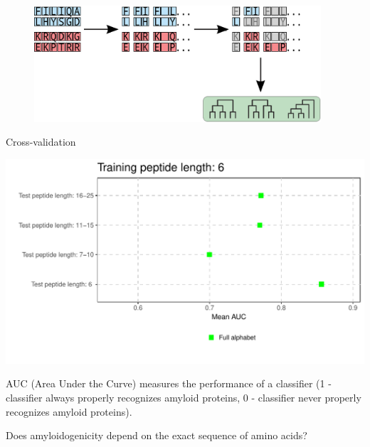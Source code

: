 \documentclass{beamer}\usepackage[]{graphicx}\usepackage[]{color}
\makeatletter
\def\maxwidth{ %
  \ifdim\Gin@nat@width>\linewidth
    \linewidth
  \else
    \Gin@nat@width
  \fi
}
\newenvironment{knitrout}{}{} %
\makeatother
\begin{document}
    \begin{frame}
\begin{figure} 
\includegraphics[width=0.95\textwidth]{static_figure/ngram1.eps}
\end{figure}
  \end{frame}

\begin{frame}{Cross-validation}
\begin{knitrout}
\color{fgcolor}

{\centering \includegraphics[width=\maxwidth]{figure/unnamed-chunk-9-1} 

}



\end{knitrout}
AUC (Area Under the Curve) measures the performance of a classifier (1 - classifier always properly recognizes amyloid proteins, 0 - classifier never properly recognizes amyloid proteins).

\end{frame}


\begin{frame}
  Does amyloidogenicity depend on the exact sequence of amino acids?
  \end{frame}
\end{document}
